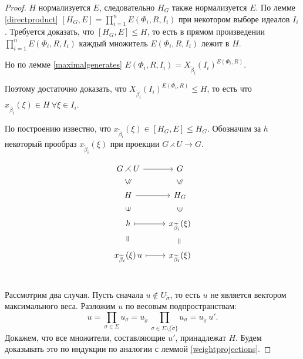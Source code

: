 \documentclass[10pt]{article}
\theoremstyle{break}
\theoremstyle{remark}
\renewcommand{\le}{\leqslant}
\begin{document}
\begin{proof}
  $H$ нормализуется $E$, следовательно $H_G$ также нормализуется $E$. По лемме \ref{directproduct} $[H_G,E] = \prod_{i=1}^n E(\Phi_i,R,I_i)$ при некотором выборе идеалов $I_i$. Требуется доказать, что $[H_G,E] \le H$, то есть в прямом произведении $\prod_{i=1}^n E(\Phi_i,R,I_i)$ каждый множитель $E(\Phi_i,R,I_i)$  лежит в $H$.

Но по лемме \ref{maximalgenerates} $E(\Phi_i,R,I_i) = X_{\widetilde\beta_i}(I_i)^{E(\Phi_i,R)}$.

Поэтому достаточно доказать, что $X_{\widetilde\beta_i}(I_i)^{E(\Phi_i,R)} \le H$, то есть что
$x_{\widetilde{\beta_i}}(\xi) \in H \ \forall \xi \in I_i$.

По построению известно, что $x_{\widetilde\beta_i}(\xi) \in [H_G,E] \le H_G$.
Обозначим за $h$ некоторый прообраз $x_{\widetilde\beta_i}(\xi)$ при проекции $G \rightthreetimes U \rightarrow G$.

\begin{equation*}
\tikzset{
  Subgroup/.style={
    draw=none,
    every to/.append style={
      edge node={node [sloped, allow upside down, auto=false]{$\le$}}}},
  Equals/.style={
    draw=none,
    every to/.append style={
      edge node={node [sloped, allow upside down, auto=false]{$=$}}}},
  Included/.style={
    draw=none,
    every to/.append style={
      edge node={node [sloped, allow upside down, auto=false]{$\in$}}}}
}
\begin{tikzcd}
G \rightthreetimes U \arrow{r}{} & G \\
H \arrow[Subgroup]{u} \arrow{r}{} & H_G \arrow[Subgroup]{u} \\
h \arrow[Included]{u} \arrow[maps to]{r}{} & x_{\widetilde\beta_i}(\xi) \arrow[Included]{u} \\
x_{\widetilde\beta_i}(\xi)\,u \arrow[Equals]{u} \arrow[maps to]{r}{} & x_{\widetilde\beta_i}(\xi) \arrow[Equals]{u} \\
\end{tikzcd}
\end{equation*}

Рассмотрим два случая. Пусть сначала $u \notin U_{\widetilde\sigma}$, то есть $u$ не является вектором максимального веса.
Разложим $u$ по весовым подпространствам: $$u = \prod_{\sigma \in \Sigma} u_\sigma = u_{\widetilde\sigma} \, \prod_{\sigma \in \Sigma \setminus \{\widetilde\sigma\} } u_\sigma = u_{\widetilde\sigma} \, u'  .$$
Докажем, что все множители, составляющие $u'$, принадлежат $H$. Будем доказывать это по индукции по аналогии с леммой \ref{weightprojections}.


\end{proof}
\end{document}
